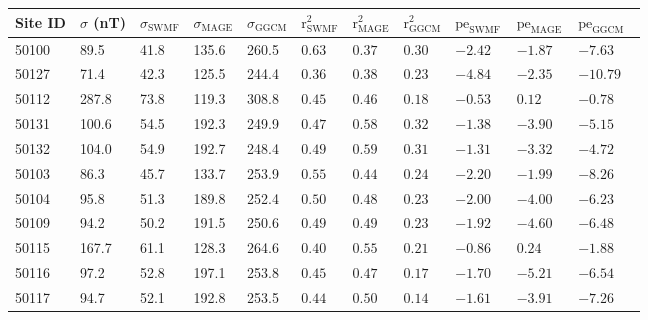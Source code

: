 \begin{tabular}{l p{1cm} p{1cm} p{1cm} p{1cm} p{1cm} p{1cm} p{1cm} p{1cm} p{1cm} p{1cm}}
Site ID & $\sigma$ (nT) & $\sigma_\text{SWMF}$ & $\sigma_\text{MAGE}$ & $\sigma_\text{GGCM}$ & $\text{r}^2_\text{SWMF}$ & $\text{r}^2_\text{MAGE}$ & $\text{r}^2_\text{GGCM}$ & $\text{pe}_\text{SWMF}$ & $\text{pe}_\text{MAGE}$ & $\text{pe}_\text{GGCM}$ \\
\hline
50100 & 89.5 & 41.8 & 135.6 & 260.5 & $0.63\phantom{*}$ & $0.37\phantom{*}$ & $0.30\phantom{*}$ & $-2.42\phantom{*}$ & $-1.87\phantom{*}$ & $-7.63\phantom{*}$ \\
50127 & 71.4 & 42.3 & 125.5 & 244.4 & $0.36\phantom{*}$ & $0.38\phantom{*}$ & $0.23\phantom{*}$ & $-4.84\phantom{*}$ & $-2.35\phantom{*}$ & $-10.79\phantom{*}$ \\
50112 & 287.8 & 73.8 & 119.3 & 308.8 & $0.45\phantom{*}$ & $0.46\phantom{*}$ & $0.18\phantom{*}$ & $-0.53\phantom{*}$ & $0.12\phantom{*}$ & $-0.78\phantom{*}$ \\
50131 & 100.6 & 54.5 & 192.3 & 249.9 & $0.47\phantom{*}$ & $0.58\phantom{*}$ & $0.32\phantom{*}$ & $-1.38\phantom{*}$ & $-3.90\phantom{*}$ & $-5.15\phantom{*}$ \\
50132 & 104.0 & 54.9 & 192.7 & 248.4 & $0.49\phantom{*}$ & $0.59\phantom{*}$ & $0.31\phantom{*}$ & $-1.31\phantom{*}$ & $-3.32\phantom{*}$ & $-4.72\phantom{*}$ \\
50103 & 86.3 & 45.7 & 133.7 & 253.9 & $0.55\phantom{*}$ & $0.44\phantom{*}$ & $0.24\phantom{*}$ & $-2.20\phantom{*}$ & $-1.99\phantom{*}$ & $-8.26\phantom{*}$ \\
50104 & 95.8 & 51.3 & 189.8 & 252.4 & $0.50\phantom{*}$ & $0.48\phantom{*}$ & $0.23\phantom{*}$ & $-2.00\phantom{*}$ & $-4.00\phantom{*}$ & $-6.23\phantom{*}$ \\
50109 & 94.2 & 50.2 & 191.5 & 250.6 & $0.49\phantom{*}$ & $0.49\phantom{*}$ & $0.23\phantom{*}$ & $-1.92\phantom{*}$ & $-4.60\phantom{*}$ & $-6.48\phantom{*}$ \\
50115 & 167.7 & 61.1 & 128.3 & 264.6 & $0.40\phantom{*}$ & $0.55\phantom{*}$ & $0.21\phantom{*}$ & $-0.86\phantom{*}$ & $0.24\phantom{*}$ & $-1.88\phantom{*}$ \\
50116 & 97.2 & 52.8 & 197.1 & 253.8 & $0.45\phantom{*}$ & $0.47\phantom{*}$ & $0.17\phantom{*}$ & $-1.70\phantom{*}$ & $-5.21\phantom{*}$ & $-6.54\phantom{*}$ \\
50117 & 94.7 & 52.1 & 192.8 & 253.5 & $0.44\phantom{*}$ & $0.50\phantom{*}$ & $0.14\phantom{*}$ & $-1.61\phantom{*}$ & $-3.91\phantom{*}$ & $-7.26\phantom{*}$ \\

\end{tabular}
